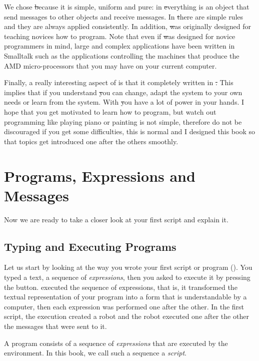 We chose \st because it is simple, uniform and pure: in \st everything is an object that send messages to other objects and receive messages. In \st there are simple rules and they are always applied consistently. In addition, \st was originally designed for teaching novices how to program. Note that even if \st was designed for novice programmers in mind, large and complex applications have been written in Smalltalk such as the applications controlling the machines that produce the AMD micro-processors that you may have on your current computer. 

Finally, a really interesting aspect of \sq is that it completely written in \st. This implies that if you understand \st you can change, adapt the system to your own needs or 
learn from the system. With \st you have a lot of power in your hands. I hope that you get motivated to learn how to program, but watch out programming like playing piano or painting is not simple, therefore do not be discouraged if you get some difficulties, this is normal and I designed this book so that topics get introduced one after the others smoothly.

\section{Programs, Expressions and Messages}
Now we are ready to take a closer look at your first script and explain it. 
 
\subsection{Typing and Executing Programs}
Let us start by looking at the way you wrote your first script or program (). You typed a text, a sequence of \emph{expressions}, then you asked \sq to execute it by pressing the  button. \sq executed the sequence of expressions, that is, it transformed the textual representation of your program into a form that is understandable by a computer, then each expression was performed one after the other. In the first script, the execution created a robot and the robot executed one after the other the messages that were sent to it. 

A program consists of a sequence of \textit{expressions} that are executed by the \sq environment. In this book, we call such a sequence a  \emph{script}.
  
  
